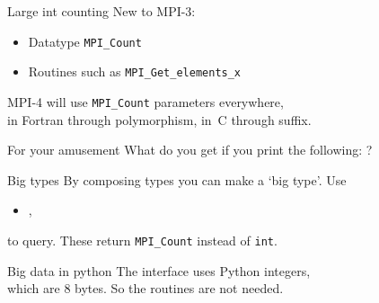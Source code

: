 
\begin{numberedframe}{Large int counting}
  New to MPI-3: 
  \begin{itemize}
  \item Datatype \lstinline{MPI_Count}
  \item Routines such as \lstinline{MPI_Get_elements_x}
  \end{itemize}

  MPI-4 will use \lstinline{MPI_Count} parameters everywhere,\\
  in Fortran through polymorphism, in~C through  suffix.
\end{numberedframe}


\begin{numberedframe}{For your amusement}
What do you get if you print the following:
?
\end{numberedframe}

\begin{numberedframe}{Big types}
  By composing types you can make a `big type'. Use
  \begin{itemize}
  \item {},
  \end{itemize}
  to query.
  These return \lstinline{MPI_Count} instead of \lstinline{int}.
\end{numberedframe}

\begin{numberedframe}{Big data in python}
  The  interface uses Python integers,\\
  which are 8 bytes. So the  routines are not needed.
\end{numberedframe}

\endinput

\begin{numberedframe}{}
\begin{lstlisting}
\end{lstlisting}
\end{numberedframe}

